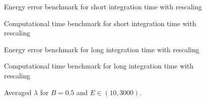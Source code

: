 \documentclass{beamer}
\begin{document}

\begin{frame}
	\begin{figure}
		
		\caption{Energy error benchmark for short integration time with rescaling}
	\end{figure}
\end{frame}


\begin{frame}
	\begin{figure}
		
		\caption{Computational time benchmark for short integration time with rescaling}
	\end{figure}
\end{frame}


\begin{frame}
	\begin{figure}
		
		\caption{Energy error benchmark for long integration time with rescaling}
	\end{figure}
\end{frame}


\begin{frame}
	\begin{figure}
		
		\caption{Computational time benchmark for long integration time with rescaling}
	\end{figure}
\end{frame}


\begin{frame}
	\begin{figure}
		
		\caption{Averaged \(\lambda\) for \(B=0.5\) and \(E \in (10, 3000)\).}
	\end{figure}
\end{frame}
\end{document}
